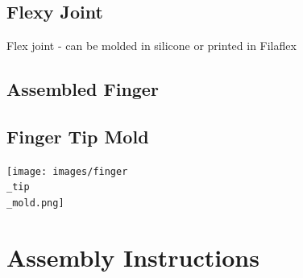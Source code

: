 \documentclass[11pt]{article}
\begin{document}
\hypertarget{thing_flexy\_joint}{\subsection{Flexy Joint}}
Flex joint - can be molded in silicone or printed in Filaflex

\hypertarget{thing_finger\_assembly}{\subsection{Assembled Finger}}

\hypertarget{thing_finger\_tip\_mold}{\subsection{Finger Tip Mold}}
\texttt{[image: images/finger\\\_tip\\\_mold.png]}

\newpage

\section{Assembly Instructions}

\newpage
\end{document}

